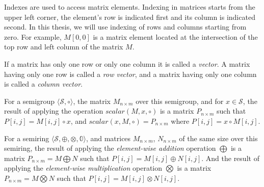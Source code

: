 Indexes are used to access matrix elements. Indexing in matrices starts from the upper left corner, the element's row is indicated first and its column is indicated second. In this thesis, we will use indexing of rows and columns starting from zero. For example, $M[0, 0]$ is a matrix element located at the intersection of the top row and left column of the matrix $M$.

\begin{definition}[A vector]
If a matrix has only one row or only one column it is called a \emph{vector}. A matrix having only one row is called a \textit{row vector}, and a matrix having only one column is called a \textit{column vector}.
\end{definition}

%
\begin{definition}
For a semigroup $\langle \mathcal{S}, \circ \rangle$, the matrix $M_{n \times m}$ over this semigroup, and for $x \in \mathcal{S}$, the result of applying the operation
$
scalar(M, x, \circ)  
$
is a matrix
$
P_{n \times m}
$
such that $P[i, j] = M[i, j] \circ x$, and
$
scalar(x, M, \circ) = P_{n \times m}
$
 where $P[i, j] = x \circ M[i, j]$.

\end{definition}

\begin{definition}

For a semiring $\langle \mathcal{S}, \oplus, \otimes, \mathbb{0} \rangle$, and matrices $M_{n \times m}$, $N_{n \times m}$ of the same size over this semiring, the result of applying the \textit{element-wise addition} operation $\bigoplus$ is a matrix
$
P_{n \times m}= M \bigoplus N
$
such that $P[i, j] = M[i, j] \oplus N[i, j]$. And the result of applying the \textit{element-wise multiplication} operation $\bigotimes$ is a matrix
$
P_{n \times m}= M \bigotimes N
$
such that $P[i, j] = M[i, j] \otimes N[i, j]$.

\end{definition}

